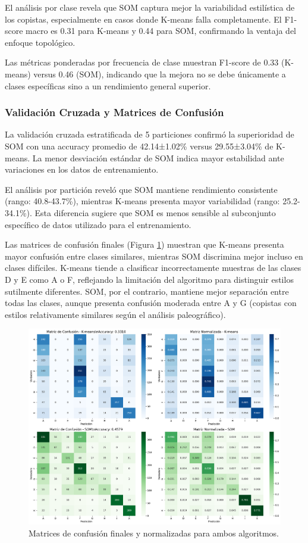 \documentclass[12pt,a4paper]{article}
\begin{document}
El análisis por clase revela que SOM captura mejor la variabilidad estilística de los copistas, especialmente en casos donde K-means falla completamente. El F1-score macro es 0.31 para K-means y 0.44 para SOM, confirmando la ventaja del enfoque topológico.

Las métricas ponderadas por frecuencia de clase muestran F1-score de 0.33 (K-means) versus 0.46 (SOM), indicando que la mejora no se debe únicamente a clases específicas sino a un rendimiento general superior.

\subsubsection{Validación Cruzada y Matrices de Confusión}

La validación cruzada estratificada de 5 particiones confirmó la superioridad de SOM con una accuracy promedio de 42.14±1.02\% versus 29.55±3.04\% de K-means. La menor desviación estándar de SOM indica mayor estabilidad ante variaciones en los datos de entrenamiento.

El análisis por partición reveló que SOM mantiene rendimiento consistente (rango: 40.8-43.7\%), mientras K-means presenta mayor variabilidad (rango: 25.2-34.1\%). Esta diferencia sugiere que SOM es menos sensible al subconjunto específico de datos utilizado para el entrenamiento.

Las matrices de confusión finales (Figura \ref{fig:validacion_final}) muestran que K-means presenta mayor confusión entre clases similares, mientras SOM discrimina mejor incluso en clases difíciles. K-means tiende a clasificar incorrectamente muestras de las clases D y E como A o F, reflejando la limitación del algoritmo para distinguir estilos sutilmente diferentes. SOM, por el contrario, mantiene mejor separación entre todas las clases, aunque presenta confusión moderada entre A y G (copistas con estilos relativamente similares según el análisis paleográfico).

\begin{figure}[H]
    \centering
    \includegraphics[width=\textwidth]{figures/figura__validacion_cruzada_final.pdf}
    \caption{Matrices de confusión finales y normalizadas para ambos algoritmos.}
    \label{fig:validacion_final}
\end{figure}
\end{document}
